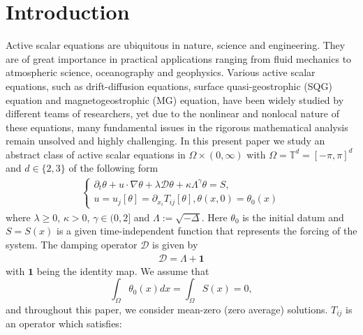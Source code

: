 \documentclass[reqno]{amsart}%
\theoremstyle{definition}
\theoremstyle{remark}
\numberwithin{equation}{section}
\newcommand{\1}{\mathbf{1}}
\numberwithin{equation}{section}
\numberwithin{theorem}{section}
\numberwithin{figure}{section}
\begin{document}
\maketitle
\tableofcontents
\section{Introduction}\label{introduction}

Active scalar equations are ubiquitous in nature, science and engineering. They are of great importance in practical applications ranging from fluid mechanics to atmospheric science, oceanography and geophysics. Various active scalar equations, such as drift-diffusion equations, surface quasi-geostrophic (SQG) equation and magnetogeostrophic (MG) equation, have been widely studied by different teams of researchers, yet due to the nonlinear and nonlocal nature of these equations, many fundamental issues in the rigorous mathematical analysis remain unsolved and highly challenging. In this present paper we study an abstract class of active scalar equations in $\Omega\times(0,\infty)$ with $\Omega=\mathbb{T}^d=[-\pi,\pi]^d$ and $d\in\{2,3\}$ of the following form
\begin{align}
\label{abstract active scalar eqn} \left\{ \begin{array}{l}
\partial_t\theta+u\cdot\nabla\theta+\lambda\mathcal{D}\theta+\kappa\Lambda^{\gamma}\theta=S, \\
u=u_j[\theta]=\partial_{x_i} T_{ij}[\theta],\theta(x,0)=\theta_0(x)
\end{array}\right.
\end{align}
where $\lambda\ge0$, $\kappa>0$, $\gamma\in(0,2]$ and $\Lambda:=\sqrt{-\Delta}$. Here $\theta_0$ is the initial datum and $S=S(x)$ is a given time-independent function that represents the forcing of the system. The damping operator $\mathcal{D}$ is given by
\begin{align}\label{def of damping}
\mathcal{D}=\Lambda+\mathbf{1}
\end{align}
with $\mathbf{1}$ being the identity map. We assume that
\begin{equation}\label{zero mean assumption on data and forcing}
\int_{\Omega}\theta_0(x)dx=\int_{\Omega}S(x)=0,
\end{equation}
and throughout this paper, we consider mean-zero (zero average) solutions. $T_{ij}$ is an operator which satisfies:
\end{document}
